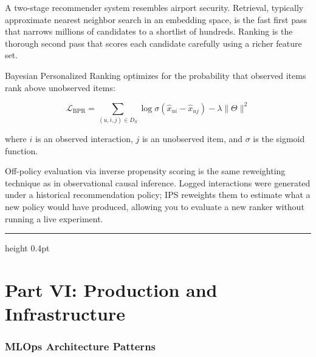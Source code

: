 \documentclass[12pt,a4paper]{article}
\begin{document}
\begin{analogy}
A two-stage recommender system resembles airport security. Retrieval,
typically approximate nearest neighbor search in an embedding space, is
the fast first pass that narrows millions of candidates to a shortlist of
hundreds. Ranking is the thorough second pass that scores each candidate
carefully using a richer feature set.
\end{analogy}

Bayesian Personalized Ranking optimizes for the probability that observed
items rank above unobserved items:

\begin{equation*}
  \mathcal{L}_{\text{BPR}}
  = \sum_{(u,i,j)\in D_S}
    \log\sigma(\hat{x}_{ui} - \hat{x}_{uj})
    - \lambda\|\Theta\|^2
\end{equation*}

where $i$ is an observed interaction, $j$ is an unobserved item, and
$\sigma$ is the sigmoid function.

\begin{mentalmodel}
Off-policy evaluation via inverse propensity scoring is the same
reweighting technique as in observational causal inference. Logged
interactions were generated under a historical recommendation policy;
IPS reweights them to estimate what a new policy would have produced,
allowing you to evaluate a new ranker without running a live experiment.
\end{mentalmodel}

\vspace{10pt}\hrule height 0.4pt\vspace{14pt}

\part*{Part VI: Production and Infrastructure}

\section*{MLOps Architecture Patterns}
\end{document}
